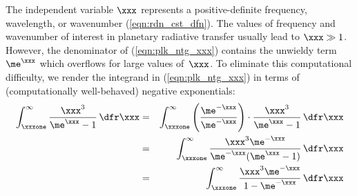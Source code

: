 \documentclass[12pt]{article}
\begin{document}
The independent variable $\xxx$ represents a positive-definite frequency, wavelength, or wavenumber (\ref{eqn:rdn_cst_dfn}).
The values of frequency and wavenumber of interest in planetary radiative transfer usually lead to $\xxx \gg 1$.
However, the denominator of (\ref{eqn:plk_ntg_xxx}) contains the unwieldy term $\me^{\xxx}$ which overflows for large values of~$\xxx$.
To eliminate this computational difficulty, we render the integrand in (\ref{eqn:plk_ntg_xxx}) in terms of (computationally well-behaved) negative exponentials:
\begin{eqnarray}
\label{eqn:plk_ntg_xxx_ngt}
\int_{\xxxone}^{\infty} 
\frac{\xxx^{3}}{\me^{\xxx} - 1} \,\dfr\xxx 
& = &
\int_{\xxxone}^{\infty} 
\left( \frac{\me^{-\xxx}}{\me^{-\xxx}} \right) \cdot
\frac{\xxx^{3}}{\me^{\xxx} - 1} \,\dfr\xxx \nonumber \\
& = &
\int_{\xxxone}^{\infty}
\frac{\xxx^{3} \me^{-\xxx}}{\me^{-\xxx}(\me^{\xxx} - 1)} \,\dfr\xxx \nonumber \\
& = &
\int_{\xxxone}^{\infty}
\frac{\xxx^{3} \me^{-\xxx}}{1 - \me^{-\xxx}} \,\dfr\xxx
\end{eqnarray}
\end{document}
